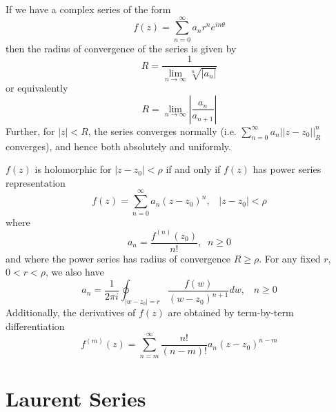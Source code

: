 \documentclass[12pt, a4paper, oneside, openright, titlepage]{book}
\begin{document}
\begin{thm}
    If we have a complex series of the form \begin{equation*}
        f(z) = \sum_{n=0}^{\infty}a_nr^ne^{in\theta}
    \end{equation*}
    then the radius of convergence of the series is given by \begin{equation*}
        R = \frac{1}{\lim\limits_{n\rightarrow \infty}\sqrt[n]{|a_n|}}
    \end{equation*}
    or equivalently \begin{equation*}
        R = \lim\limits_{n\rightarrow \infty}\left|\frac{a_n}{a_{n+1}}\right|
    \end{equation*}
    Further, for $|z| < R$, the series converges normally (i.e. $\sum_{n=0}^{\infty}a_n||z-z_0||_R^n$ converges), and hence both absolutely and uniformly.
\end{thm}

\begin{thm}
    $f(z)$ is holomorphic for $|z-z_0| < \rho$ if and only if $f(z)$ has power series representation \begin{equation*}
        f(z) = \sum_{n=0}^{\infty}a_n(z-z_0)^n,\;\;\;|z-z_0| < \rho
    \end{equation*}
    where \begin{equation*}
        a_n = \frac{f^{(n)}(z_0)}{n!},\;\;n\geq 0
    \end{equation*}
    and where the power series has radius of convergence $R \geq \rho$. For any fixed $r$, $0 < r < \rho$, we also have \begin{equation*}
        a_n = \frac{1}{2\pi i}\oint_{|w-z_0| = r}\frac{f(w)}{(w-z_0)^{n+1}}dw,\;\;\;n\geq 0
    \end{equation*}
    Additionally, the derivatives of $f(z)$ are obtained by term-by-term differentiation \begin{equation*}
        f^{(m)}(z) = \sum_{n=m}^{\infty}\frac{n!}{(n-m)!}a_n(z-z_0)^{n-m}
    \end{equation*}
\end{thm}











\section{Laurent Series}
\end{document}
